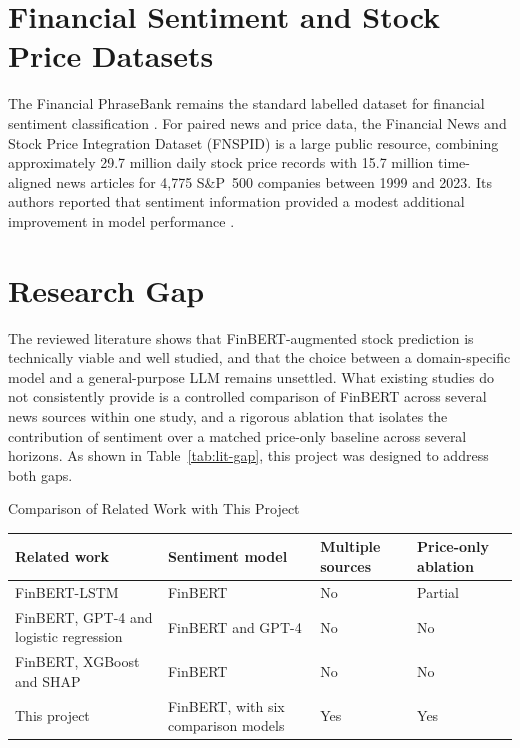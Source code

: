 \section{Financial Sentiment and Stock Price Datasets}
The Financial PhraseBank remains the standard labelled dataset for financial sentiment classification \parencite{malo2014good}. For paired news and price data, the Financial News and Stock Price Integration Dataset (FNSPID) is a large public resource, combining approximately 29.7 million daily stock price records with 15.7 million time-aligned news articles for 4,775 S\&P~500 companies between 1999 and 2023. Its authors reported that sentiment information provided a modest additional improvement in model performance \parencite{dong2024fnspid}.

\section{Research Gap}
The reviewed literature shows that FinBERT-augmented stock prediction is technically viable and well studied, and that the choice between a domain-specific model and a general-purpose LLM remains unsettled. What existing studies do not consistently provide is a controlled comparison of FinBERT across several news sources within one study, and a rigorous ablation that isolates the contribution of sentiment over a matched price-only baseline across several horizons. As shown in Table~\ref{tab:lit-gap}, this project was designed to address both gaps.

\begin{utptable}{Comparison of Related Work with This Project}
\label{tab:lit-gap}
\begin{tabular}{@{}P{6.2cm}P{3.2cm}P{1.8cm}P{1.8cm}@{}}
\toprule
\textbf{Related work} & \textbf{Sentiment model} & \textbf{Multiple sources} & \textbf{Price-only ablation} \\
\midrule
FinBERT-LSTM \parencite{gu2024predicting} & FinBERT & No & Partial \\
FinBERT, GPT-4 and logistic regression \parencite{ai2024innovative} & FinBERT and GPT-4 & No & No \\
FinBERT, XGBoost and SHAP \parencite{mathematics2025stock} & FinBERT & No & No \\
This project & FinBERT, with six comparison models & Yes & Yes \\
\bottomrule
\end{tabular}
\end{utptable}
